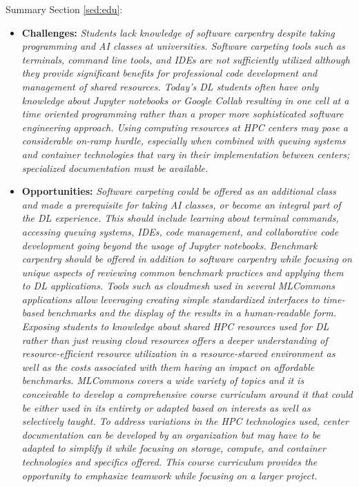 \begin{tcolorbox}
Summary Section \ref{sed:edu}:

\begin{itemize}

\item {\bf Challenges:} {\it Students lack knowledge of software carpentry despite taking programming and AI classes at universities. Software carpeting tools such as terminals, command line tools, and IDEs are not sufficiently utilized although they provide significant benefits for professional code development and management of shared resources. Today's DL students often have only knowledge about Jupyter notebooks or Google Collab resulting in one cell at a time oriented programming rather than a proper more sophisticated software engineering approach. Using computing resources at HPC centers may pose a considerable on-ramp hurdle, especially when combined with queuing systems and container technologies that vary in their implementation between centers; specialized documentation must be available.}
\item {\bf Opportunities:} {\it Software carpeting could be offered as an additional class and made a prerequisite for taking AI classes, or become an integral part of the DL experience. This should include learning about terminal commands, accessing queuing systems, IDEs, code management, and collaborative code development going beyond the usage of Jupyter notebooks. Benchmark carpentry should be offered in addition to software carpentry while focusing on unique aspects of reviewing common benchmark practices and applying them to DL applications. Tools such as cloudmesh used in several MLCommons applications allow leveraging creating simple standardized interfaces to time-based benchmarks and the display of the results in a human-readable form. Exposing students to knowledge about shared HPC resources used for DL rather than just reusing cloud resources offers a deeper understanding of resource-efficient resource utilization in a resource-starved environment as well as the costs associated with them having an impact on affordable benchmarks. MLCommons covers a wide variety of topics and it is conceivable to develop a comprehensive course curriculum around it that could be either used in its entirety or adapted based on interests as well as selectively taught. To address variations in the HPC technologies used, center documentation can be developed by an organization but may have to be adapted to simplify it while focusing on storage, compute, and container technologies and specifics offered. This course curriculum provides the opportunity to emphasize teamwork while focusing on a larger project.}

\end{itemize}

\end{tcolorbox}



